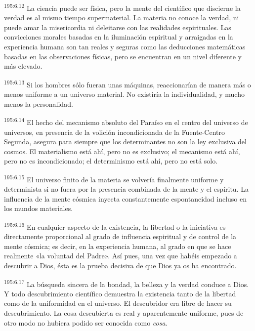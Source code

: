 \par 
\textsuperscript{195:6.12} La ciencia puede ser física, pero la mente del científico que discierne la verdad es al mismo tiempo supermaterial. La materia no conoce la verdad, ni puede amar la misericordia ni deleitarse con las realidades espirituales. Las convicciones morales basadas en la iluminación espiritual y arraigadas en la experiencia humana son tan reales y seguras como las deducciones matemáticas basadas en las observaciones físicas, pero se encuentran en un nivel diferente y más elevado.

\par 
\textsuperscript{195:6.13} Si los hombres sólo fueran unas máquinas, reaccionarían de manera más o menos uniforme a un universo material. No existiría la individualidad, y mucho menos la personalidad.

\par 
\textsuperscript{195:6.14} El hecho del mecanismo absoluto del Paraíso en el centro del universo de universos, en presencia de la volición incondicionada de la Fuente-Centro Segunda, asegura para siempre que los determinantes no son la ley exclusiva del cosmos. El materialismo está ahí, pero no es exclusivo; el mecanismo está ahí, pero no es incondicionado; el determinismo está ahí, pero no está solo.

\par 
\textsuperscript{195:6.15} El universo finito de la materia se volvería finalmente uniforme y determinista si no fuera por la presencia combinada de la mente y el espíritu. La influencia de la mente cósmica inyecta constantemente espontaneidad incluso en los mundos materiales.

\par 
\textsuperscript{195:6.16} En cualquier aspecto de la existencia, la libertad o la iniciativa es directamente proporcional al grado de influencia espiritual y de control de la mente cósmica; es decir, en la experiencia humana, al grado en que se hace realmente «la voluntad del Padre». Así pues, una vez que habéis empezado a descubrir a Dios, ésta es la prueba decisiva de que Dios ya os ha encontrado.

\par 
\textsuperscript{195:6.17} La búsqueda sincera de la bondad, la belleza y la verdad conduce a Dios. Y todo descubrimiento científico demuestra la existencia tanto de la libertad como de la uniformidad en el universo. El descubridor era libre de hacer su descubrimiento. La cosa descubierta es real y aparentemente uniforme, pues de otro modo no hubiera podido ser conocida como \textit{cosa}.

